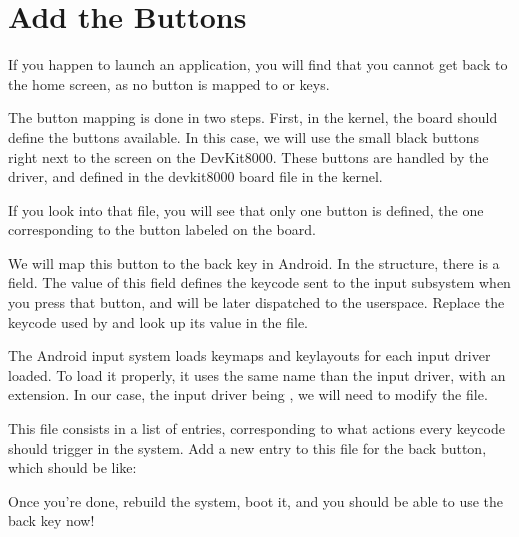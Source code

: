 \section{Add the Buttons}

If you happen to launch an application, you will find that you cannot
get back to the home screen, as no button is mapped to  or 
keys.

The button mapping is done in two steps. First, in the kernel, the
board should define the buttons available. In this case, we will use
the small black buttons right next to the screen on the
DevKit8000. These buttons are handled by the  driver,
and defined in the devkit8000 board file in the kernel.

If you look into that file, you will see that only one button is
defined, the one corresponding to the button labeled 
on the board.

We will map this button to the back key in Android. In the
 structure, there is a  field. The
value of this field defines the keycode sent to the input
subsystem when you press that button, and will be later dispatched to
the userspace. Replace the keycode used by  and look up
its value in the  file.

The Android input system loads keymaps and keylayouts for each input
driver loaded. To load it properly, it uses the same name than the
input driver, with an extension. In our case, the input driver being
, we will need to modify the  file.

This file consists in a list of entries, corresponding to what actions
every keycode should trigger in the system. Add a new entry to this file
for the back button, which should be like:

Once you're done, rebuild the system, boot it, and you should be able
to use the back key now!
